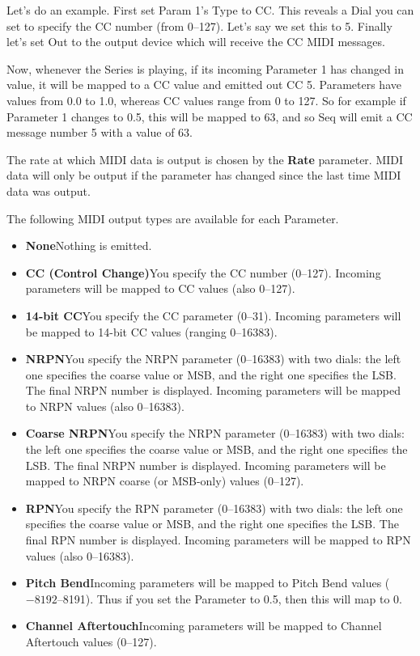 \documentclass[twoside,10pt]{article}
\begin{document}
Let's do an example.  First set Param 1's Type to CC.  This reveals a Dial you can set to specify the CC number (from 0--127).  Let's say we set this to 5.  Finally let's set Out to the output device which will receive the CC MIDI messages.

Now, whenever the Series is playing, if its incoming Parameter 1 has changed in value, it will be mapped to a CC value and emitted out CC 5.  Parameters have values from 0.0 to 1.0, whereas CC values range from 0 to 127.  So for example if Parameter 1 changes to 0.5, this will be mapped to 63, and so Seq will emit a CC message number 5 with a value of 63.

The rate at which MIDI data is output is chosen by the {\bf Rate} parameter.  MIDI data will only be output if the parameter has changed since the last time MIDI data was output.

The following MIDI output types are available for each Parameter.

\begin{itemize} 
\item {\bf None}\quad Nothing is emitted.
\item {\bf CC (Control Change)}\quad You specify the CC number (0--127).  Incoming parameters will be mapped to CC values (also 0--127).
\item {\bf 14-bit CC}\quad You specify the CC parameter (0--31).  Incoming parameters will be mapped to 14-bit CC values (ranging 0--16383).
\item {\bf NRPN}\quad You specify the NRPN parameter (0--16383) with two dials: the left one specifies the coarse value or MSB, and the right one specifies the LSB.  The final NRPN number is displayed.  Incoming parameters will be mapped to NRPN values (also 0--16383).
\item {\bf Coarse NRPN}\quad You specify the NRPN parameter (0--16383) with two dials: the left one specifies the coarse value or MSB, and the right one specifies the LSB.  The final NRPN number is displayed.  Incoming parameters will be mapped to NRPN coarse (or MSB-only) values (0--127).
\item {\bf RPN}\quad You specify the RPN parameter (0--16383) with two dials: the left one specifies the coarse value or MSB, and the right one specifies the LSB.  The final RPN number is displayed.  Incoming parameters will be mapped to RPN values (also 0--16383).
\item {\bf Pitch Bend}\quad Incoming parameters will be mapped to Pitch Bend values (\(-8192\)--8191).  Thus if you set the Parameter to 0.5, then this will map to 0.
\item {\bf Channel Aftertouch}\quad Incoming parameters will be mapped to Channel Aftertouch values (0--127).
\end{itemize}
\end{document}
